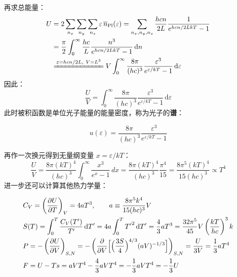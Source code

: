 再求总能量：
\begin{equation}
    \begin{split}
        U
        &=2\sum_{n_x}\sum_{n_y}\sum_{n_z}\varepsilon\,\overline n_{\mathrm{Pl}}(\varepsilon)
        =\sum_{n_x,n_y,n_z}\frac{hcn}{2L}\frac{1}{e^{hcn/2LkT}-1}\\
        &=\frac{\pi}{2}\int_0^{\infty}\frac{hc}{L}\frac{n^3}{e^{hcn/2LkT}-1}\,\mathrm{d}n\\
        &\xlongequal{\varepsilon=hcn/2L,\ V=L^3}V\int_0^{\infty}\frac{8\pi}{(hc)^3}\frac{\varepsilon^3}{e^{\varepsilon/kT}-1}\,\mathrm{d}\varepsilon
    \end{split}
\end{equation}
因此：
\begin{equation}
    \frac{U}{V}=\int_0^{\infty}\frac{8\pi}{(hc)^3}\frac{\varepsilon^3}{e^{\varepsilon/kT}-1}\,\mathrm{d}\varepsilon
\end{equation}
此时被积函数是单位光子能量的能量密度，称为光子的\textbf{谱}：
\begin{definition}[光子的谱]
    \begin{equation}
        u(\varepsilon)=\frac{8\pi}{(hc)^3}\frac{\varepsilon^3}{e^{\varepsilon/kT}-1}
    \end{equation}
\end{definition}

再作一次换元得到无量纲变量 $x=\varepsilon/kT$：
\begin{equation}
    \frac{U}{V}
    =\frac{8\pi(kT)^4}{(hc)^3}\int_0^{\infty}\frac{x^3}{e^x-1}\,dx
    =\frac{8\pi(kT)^4}{(hc)^3}\frac{\pi^4}{15}
    =\frac{8\pi^5(kT)^4}{15(hc)^3}
    \propto T^4
\end{equation}
进一步还可以计算其他热力学量：
\begin{corollary}[光子气体的热力学性质]
    \begin{align}
        &C_V=\left(\frac{\partial U}{\partial T}\right)_V=4aT^3
        ,\qquad
        a\equiv\frac{8\pi^5k^4}{15(hc)^3}V\\
        &S(T)=\int_0^T\frac{C_V(T')}{T'}\,\mathrm{d}T'
        =4a\int_0^T {T'}^2\,\mathrm{d}T'
        =\frac{4}{3}aT^3
        =\frac{32\pi^5}{45}V\left(\frac{kT}{hc}\right)^3k\\
        &P=-\left(\frac{\partial U}{\partial V}\right)_{S,N} = -\left(\frac{\partial}{\partial V}\Bigl[\Bigl(\frac{3S}{4}\Bigr)^{4/3}(aV)^{-1/3}\Bigr]\right)_{S,N}=\frac{U}{3V}=\frac{1}{3}aT^4\\
        &F=U-Ts=aVT^4-\frac{4}{3}aVT^4=-\frac{1}{3}aVT^4=-\frac{1}{3}U
    \end{align}
\end{corollary}

